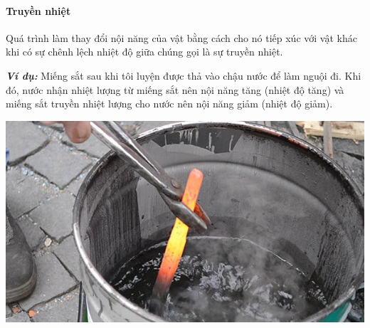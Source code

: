 \begin{tomtat}
\paragraph{Truyền nhiệt}
\begin{boxdn}
	Quá trình làm thay đổi nội năng của vật bằng cách cho nó tiếp xúc với vật khác khi có sự chênh lệch nhiệt độ giữa chúng gọi là sự truyền nhiệt.
\end{boxdn}
	\textbf{\textit{Ví dụ:}} Miếng sắt sau khi tôi luyện được thả vào chậu nước để làm nguội đi. Khi đó, nước nhận nhiệt lượng từ miếng sắt nên nội năng tăng (nhiệt độ tăng) và miếng sắt truyền nhiệt lượng cho nước nên nội năng giảm (nhiệt độ giảm).
\begin{center}
	\includegraphics[width=0.3\linewidth]{figs/VN12-Y24-PH-SYL-003-2}
\end{center}

\end{tomtat}
